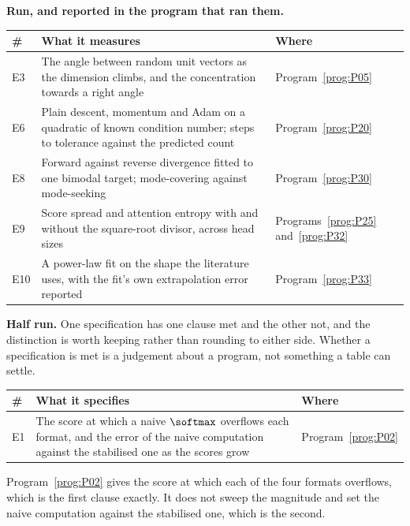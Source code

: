 \medskip
\textbf{Run, and reported in the program that ran them.}

\begin{center}
\begin{tabularx}{\linewidth}{@{}lXl@{}}
\toprule
\textbf{\#} & \textbf{What it measures} & \textbf{Where} \\
\midrule
E3 & The angle between random unit vectors as the dimension climbs, and the
  concentration towards a right angle & Program~\ref{prog:P05} \\
E6 & Plain descent, momentum and Adam on a quadratic of known condition
  number; steps to tolerance against the predicted count &
  Program~\ref{prog:P20} \\
E8 & Forward against reverse divergence fitted to one bimodal target;
  mode-covering against mode-seeking & Program~\ref{prog:P30} \\
E9 & Score spread and attention entropy with and without the square-root
  divisor, across head sizes & Programs~\ref{prog:P25}
  and~\ref{prog:P32} \\
E10 & A power-law fit on the shape the literature uses, with the fit's own
  extrapolation error reported & Program~\ref{prog:P33} \\
\bottomrule
\end{tabularx}
\end{center}

\medskip
\textbf{Half run.} One specification has one clause met and the other not,
and the distinction is worth keeping rather than rounding to either side.
Whether a specification is met is a judgement about a program, not something
a table can settle.

\begin{center}
\begin{tabularx}{\linewidth}{@{}lXl@{}}
\toprule
\textbf{\#} & \textbf{What it specifies} & \textbf{Where} \\
\midrule
E1 & The score at which a naive $\softmax$ overflows each format, and the
  error of the naive computation against the stabilised one as the scores
  grow & Program~\ref{prog:P02} \\
\bottomrule
\end{tabularx}
\end{center}

Program~\ref{prog:P02} gives the score at which each of the four formats
overflows, which is the first clause exactly. It does not sweep the magnitude
and set the naive computation against the stabilised one, which is the second.

